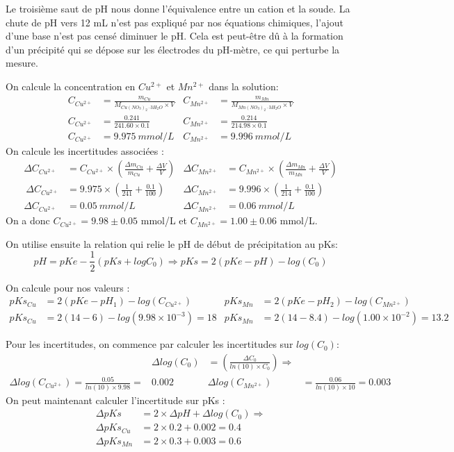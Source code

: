 \documentclass[12pt]{article}
\begin{document}
Le troisième saut de pH nous donne l'équivalence entre un cation et la soude. La chute de pH vers 12 mL n'est pas expliqué par nos équations chimiques, l'ajout d'une base n'est pas censé diminuer le pH. Cela est peut-être dû à la formation d'un précipité qui se dépose sur les électrodes du pH-mètre, ce qui perturbe la mesure. 

On calcule la concentration en $Cu^{2+}$ et $Mn^{2+}$ dans la solution:
\begin{align*}
C_{Cu^{2+}}&=\frac{m_{Cu}}{M_{Cu(NO_3)_2 \cdot 3 H_2O} \times V} & C_{Mn^{2+}}&=\frac{m_{Mn}}{M_{Mn(NO_3)_2 \cdot 3 H_2O}\times V} 
\\
C_{Cu^{2+}}&= \frac{0.241}{241.60 \times 0.1} & C_{Mn^{2+}}&= \frac{0.214}{214.98\times 0.1}
\\C_{Cu^{2+}}&=9.975 \ mmol/L & C_{Mn^{2+}}&=9.996 \ mmol/L
\end{align*}
On calcule les incertitudes associées :
\begin{align*}
\Delta C_{Cu^{2+}}&= C_{Cu^{2+}}\times(\frac{\Delta m_{Cu}}{m_{Cu}} + \frac{\Delta V}{V}) & 
\Delta C_{Mn^{2+}}&= C_{Mn^{2+}}\times(\frac{\Delta m_{Mn}}{m_{Mn}} + \frac{\Delta V}{V})
\\\
\Delta C_{Cu^{2+}}&= 9.975 \times (\frac{1}{241} + \frac{0.1}{100}) & 
\Delta C_{Mn^{2+}}&= 9.996 \times (\frac{1}{214} + \frac{0.1}{100}) \\
\Delta C_{Cu^{2+}}&= 0.05 \ mmol/L & \Delta C_{Mn^{2+}}&=0.06 \ mmol/L
\end{align*}
On a donc $C_{Cu^{2+}}=9.98 \pm 0.05$ mmol/L et $C_{Mn^{2+}}=1.00 \pm 0.06$ mmol/L. 

On utilise ensuite la relation qui relie le pH de début de précipitation au pKs: 
\begin{equation}
pH=pKe- \frac{1}{2}(pKs + log C_0) \Longrightarrow pKs=2(pKe - pH)- log(C_0)
\end{equation}

On calcule pour nos valeurs :
\begin{align*}
pKs_{Cu}&= 2(pKe-pH_1)-log(C_{Cu^{2+}}) & pKs_{Mn}&= 2(pKe-pH_2)-log(C_{Mn^{2+}}) \\
pKs_{Cu}&= 2(14-6)-log(9.98\times 10^{-3})=18 & pKs_{Mn}&=2(14-8.4)-log(1.00\times 10^{-2})=13.2
\end{align*}

Pour les incertitudes, on commence par calculer les incertitudes sur $log(C_0)$:
\begin{align*}
& \Delta log(C_0)&=(\frac{\Delta C_0}{ln(10)\times C_0}) \Longrightarrow \\
\Delta log(C_{Cu^{2+}})= \frac{0.05}{ln(10)\times 9.98 }= & 0.002 &  \Delta log(C_{Mn^{2+}})&= \frac{0.06}{ln(10)\times 10 }= 0.003
\end{align*}
On peut maintenant calculer l'incertitude sur pKs :
\begin{align*}
\Delta pKs&= 2\times \Delta pH + \Delta log(C_0) \Longrightarrow\\
\Delta pKs_{Cu}&= 2 \times 0.2 + 0.002= 0.4 \\
\Delta pKs_{Mn}&= 2 \times 0.3 + 0.003 = 0.6
\end{align*}
\end{document}
